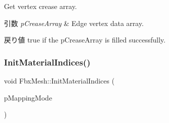 Get vertex crease array. 
\begin{DoxyParams}{引数}
{\em p\+Crease\+Array} & Edge vertex data array. \\
\hline
\end{DoxyParams}
\begin{DoxyReturn}{戻り値}
{\ttfamily true} if the p\+Crease\+Array is filled successfully. 
\end{DoxyReturn}
\mbox{\label{class_fbx_mesh_afb22daa8a980e8946abed7cbf39ce4f0}} 
\subsubsection{\texorpdfstring{Init\+Material\+Indices()}{InitMaterialIndices()}}
{\footnotesize\ttfamily void Fbx\+Mesh\+::\+Init\+Material\+Indices (\begin{DoxyParamCaption}\item[{\hyperlink{class_fbx_layer_element_a5a40e95db30ae9f94611dc3f1568af26}{Fbx\+Layer\+Element\+::\+E\+Mapping\+Mode}}]{p\+Mapping\+Mode }\end{DoxyParamCaption})}

